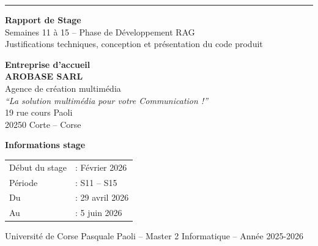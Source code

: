 \documentclass[12pt,a4paper]{report}
\begin{document}
\begin{titlepage}
  \centering\vspace*{1cm}
  {\color{primaryblue}\rule{\linewidth}{3pt}}\vspace{0.5cm}

  {\huge\bfseries\color{primaryblue} Rapport de Stage}\\[0.4cm]
  {\Large\color{darkgray} Semaines 11 \`{a} 15 -- Phase de D\'{e}veloppement RAG}\\[0.2cm]
  {\normalsize\color{darkgray} Justifications techniques, conception et pr\'{e}sentation du code produit}

  \vspace{0.5cm}{\color{primaryblue}\rule{\linewidth}{1.5pt}}\vspace{2cm}

  \begin{minipage}{0.48\textwidth}
    \centering\textbf{\large Entreprise d'accueil}\\[0.3cm]
    {\color{primaryblue}\large\bfseries AROBASE SARL}\\[0.2cm]
    \small Agence de cr\'{e}ation multim\'{e}dia\\
    \textit{``La solution multim\'{e}dia pour votre Communication !''}\\[0.3cm]
    19 rue cours Paoli\\
    20250 Corte -- Corse
  \end{minipage}
  \hfill
  \begin{minipage}{0.48\textwidth}
    \centering\textbf{\large Informations stage}\\[0.3cm]
    \begin{tabular}{ll}
      \small D\'{e}but du stage   & \small : F\'{e}vrier 2026 \\
      \small P\'{e}riode          & \small : S11 -- S15 \\
      \small Du                   & \small : 29 avril 2026 \\
      \small Au                   & \small : 5 juin 2026 \\
    \end{tabular}
  \end{minipage}

  \vspace{3cm}

  \vfill{\color{darkgray}\small Universit\'{e} de Corse Pasquale Paoli -- Master 2 Informatique -- Ann\'{e}e 2025-2026}
\end{titlepage}
\end{document}
